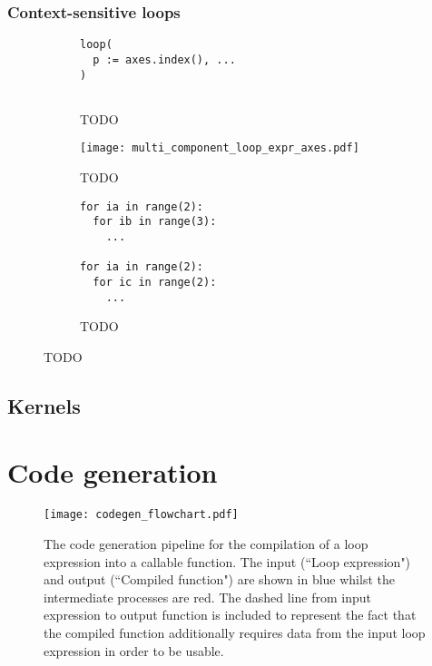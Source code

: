 \documentclass[thesis]{subfiles}
\begin{document}
\subsubsection{Context-sensitive loops}

\begin{figure}[h]
  \centering

  \begin{subfigure}[t]{.32\textwidth}
    \centering
    \begin{verbatim}
loop(
  p := axes.index(), ...
)


    \end{verbatim}
    \caption{TODO}
    \label{fig:multi_component_loop_expr_init}
  \end{subfigure}
  \begin{subfigure}[t]{.32\textwidth}
    \centering
    \texttt{[image: multi\_component\_loop\_expr\_axes.pdf]}
    \caption{TODO}
    \label{fig:multi_component_loop_expr_axes}
  \end{subfigure}
  \begin{subfigure}[t]{.32\textwidth}
    \centering
    \begin{verbatim}
for ia in range(2):
  for ib in range(3):
    ...

for ia in range(2):
  for ic in range(2):
    ...
    \end{verbatim}
    \caption{TODO}
    \label{fig:multi_component_loop_expr_codegen}
  \end{subfigure}

  \caption{TODO}
  \label{fig:multi_component_loop_expr}
\end{figure}

\subsection{Kernels}


\section{Code generation}
\label{sec:codegen}

\begin{figure}[h]
  \centering
  \texttt{[image: codegen\_flowchart.pdf]}
  \caption{
    The code generation pipeline for the compilation of a loop expression into a callable function.
    The input (``Loop expression") and output (``Compiled function") are shown in blue whilst the intermediate processes are red.
    The dashed line from input expression to output function is included to represent the fact that the compiled function additionally requires data from the input loop expression in order to be usable.
  }
  \label{fig:codegen_flowchart}
\end{figure}
\end{document}
